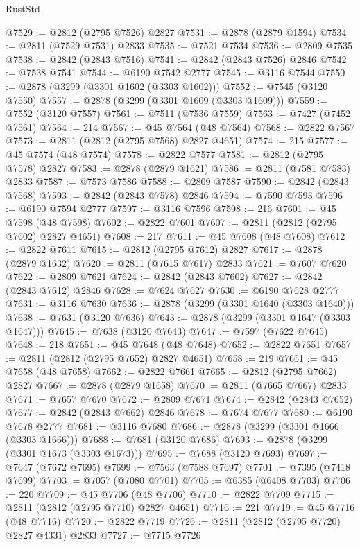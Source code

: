\begin{lexlean}{RustStd}
\begin{coremodule}
@7529 := @2812 (@2795 @7526) @2827
@7531 := @2878 (@2879 @1594)
@7534 := @2811 (@7529 @7531) @2833
@7535 := @7521 @7534
@7536 := @2809 @7535
@7538 := @2842 (@2843 @7516)
@7541 := @2842 (@2843 @7526) @2846
@7542 := @7538 @7541
@7544 := @6190 @7542 @2777
@7545 := @3116 @7544
@7550 := @2878 (@3299 (@3301 @1602 (@3303 @1602)))
@7552 := @7545 (@3120 @7550)
@7557 := @2878 (@3299 (@3301 @1609 (@3303 @1609)))
@7559 := @7552 (@3120 @7557)
@7561 := @7511 (@7536 @7559)
@7563 := @7427 (@7452 @7561)
@7564 := 214
@7567 := @45 @7564 (@48 @7564)
@7568 := @2822 @7567
@7573 := @2811 (@2812 (@2795 @7568) @2827 @4651)
@7574 := 215
@7577 := @45 @7574 (@48 @7574)
@7578 := @2822 @7577
@7581 := @2812 (@2795 @7578) @2827
@7583 := @2878 (@2879 @1621)
@7586 := @2811 (@7581 @7583) @2833
@7587 := @7573 @7586
@7588 := @2809 @7587
@7590 := @2842 (@2843 @7568)
@7593 := @2842 (@2843 @7578) @2846
@7594 := @7590 @7593
@7596 := @6190 @7594 @2777
@7597 := @3116 @7596
@7598 := 216
@7601 := @45 @7598 (@48 @7598)
@7602 := @2822 @7601
@7607 := @2811 (@2812 (@2795 @7602) @2827 @4651)
@7608 := 217
@7611 := @45 @7608 (@48 @7608)
@7612 := @2822 @7611
@7615 := @2812 (@2795 @7612) @2827
@7617 := @2878 (@2879 @1632)
@7620 := @2811 (@7615 @7617) @2833
@7621 := @7607 @7620
@7622 := @2809 @7621
@7624 := @2842 (@2843 @7602)
@7627 := @2842 (@2843 @7612) @2846
@7628 := @7624 @7627
@7630 := @6190 @7628 @2777
@7631 := @3116 @7630
@7636 := @2878 (@3299 (@3301 @1640 (@3303 @1640)))
@7638 := @7631 (@3120 @7636)
@7643 := @2878 (@3299 (@3301 @1647 (@3303 @1647)))
@7645 := @7638 (@3120 @7643)
@7647 := @7597 (@7622 @7645)
@7648 := 218
@7651 := @45 @7648 (@48 @7648)
@7652 := @2822 @7651
@7657 := @2811 (@2812 (@2795 @7652) @2827 @4651)
@7658 := 219
@7661 := @45 @7658 (@48 @7658)
@7662 := @2822 @7661
@7665 := @2812 (@2795 @7662) @2827
@7667 := @2878 (@2879 @1658)
@7670 := @2811 (@7665 @7667) @2833
@7671 := @7657 @7670
@7672 := @2809 @7671
@7674 := @2842 (@2843 @7652)
@7677 := @2842 (@2843 @7662) @2846
@7678 := @7674 @7677
@7680 := @6190 @7678 @2777
@7681 := @3116 @7680
@7686 := @2878 (@3299 (@3301 @1666 (@3303 @1666)))
@7688 := @7681 (@3120 @7686)
@7693 := @2878 (@3299 (@3301 @1673 (@3303 @1673)))
@7695 := @7688 (@3120 @7693)
@7697 := @7647 (@7672 @7695)
@7699 := @7563 (@7588 @7697)
@7701 := @7395 (@7418 @7699)
@7703 := @7057 (@7080 @7701)
@7705 := @6385 (@6408 @7703)
@7706 := 220
@7709 := @45 @7706 (@48 @7706)
@7710 := @2822 @7709
@7715 := @2811 (@2812 (@2795 @7710) @2827 @4651)
@7716 := 221
@7719 := @45 @7716 (@48 @7716)
@7720 := @2822 @7719
@7726 := @2811 (@2812 (@2795 @7720) @2827 @4331) @2833
@7727 := @7715 @7726

\end{coremodule}
\end{lexlean}
